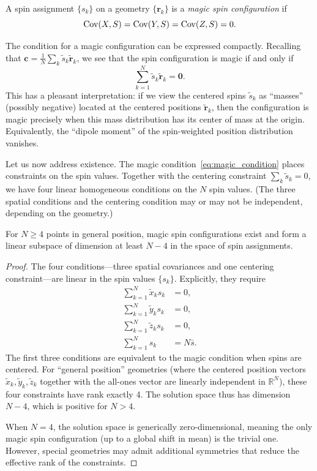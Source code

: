 \begin{definition}
A spin assignment $\{s_k\}$ on a geometry $\{\mathbf{r}_k\}$ is a \emph{magic spin configuration} if 
\[
\operatorname{Cov}(X, S) = \operatorname{Cov}(Y, S) = \operatorname{Cov}(Z, S) = 0.
\]
\end{definition}

The condition for a magic configuration can be expressed compactly. Recalling that $\mathbf{c} = \frac{1}{N} \sum_k \tilde{s}_k \tilde{\mathbf{r}}_k$, we see that the spin configuration is magic if and only if
\begin{equation}
\label{eq:magic_condition}
\sum_{k=1}^N \tilde{s}_k \tilde{\mathbf{r}}_k = \mathbf{0}.
\end{equation}
This has a pleasant interpretation: if we view the centered spins $\tilde{s}_k$ as ``masses'' (possibly negative) located at the centered positions $\tilde{\mathbf{r}}_k$, then the configuration is magic precisely when this mass distribution has its center of mass at the origin. Equivalently, the ``dipole moment'' of the spin-weighted position distribution vanishes.

Let us now address existence. The magic condition~\eqref{eq:magic_condition} places constraints on the spin values. Together with the centering constraint $\sum_k \tilde{s}_k = 0$, we have four linear homogeneous conditions on the $N$ spin values. (The three spatial conditions and the centering condition may or may not be independent, depending on the geometry.)

\begin{proposition}
\label{prop:existence}
For $N \geq 4$ points in general position, magic spin configurations exist and form a linear subspace of dimension at least $N - 4$ in the space of spin assignments.
\end{proposition}

\begin{proof}
The four conditions---three spatial covariances and one centering constraint---are linear in the spin values $\{s_k\}$. Explicitly, they require
\begin{align}
\sum_{k=1}^N \tilde{x}_k s_k &= 0, \\
\sum_{k=1}^N \tilde{y}_k s_k &= 0, \\
\sum_{k=1}^N \tilde{z}_k s_k &= 0, \\
\sum_{k=1}^N s_k &= N\bar{s}.
\end{align}
The first three conditions are equivalent to the magic condition when spins are centered. For ``general position'' geometries (where the centered position vectors $\tilde{x}_k, \tilde{y}_k, \tilde{z}_k$ together with the all-ones vector are linearly independent in $\mathbb{R}^N$), these four constraints have rank exactly 4. The solution space thus has dimension $N - 4$, which is positive for $N > 4$.

When $N = 4$, the solution space is generically zero-dimensional, meaning the only magic spin configuration (up to a global shift in mean) is the trivial one. However, special geometries may admit additional symmetries that reduce the effective rank of the constraints.
\end{proof}

